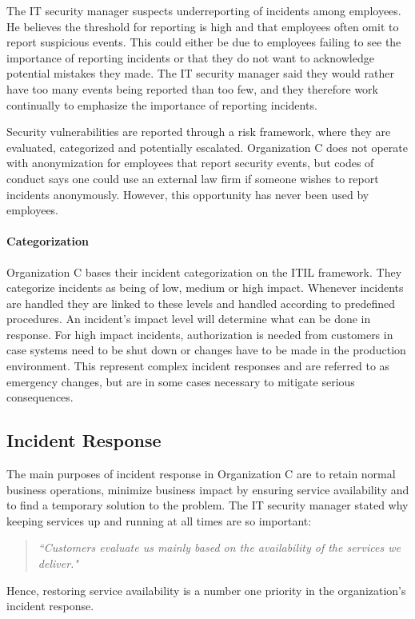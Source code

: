 The IT security manager suspects underreporting of incidents among employees. He believes the threshold for reporting is high and that employees often omit to report suspicious events. This could either be due to employees failing to see the importance of reporting incidents or that they do not want to acknowledge potential mistakes they made. The IT security manager said they would rather have too many events being reported than too few, and they therefore work continually to emphasize the importance of reporting incidents.

Security vulnerabilities are reported through a risk framework, where they are evaluated, categorized and potentially escalated. Organization C does not operate with anonymization for employees that report security events, but codes of conduct says one could use an external law firm if someone wishes to report incidents anonymously. However, this opportunity has never been used by employees. 

\paragraph{Categorization}
Organization C bases their incident categorization on the ITIL framework. They categorize incidents as being of low, medium or high impact. Whenever incidents are handled they are linked to these levels and handled according to predefined procedures. An incident's impact level will determine what can be done in response. For high impact incidents, authorization is needed from customers in case systems need to be shut down or changes have to be made in the production environment. This represent complex incident responses and are referred to as emergency changes, but are in some cases necessary to mitigate serious consequences. 

\subsection{Incident Response}
The main purposes of incident response in Organization C are to retain normal business operations, minimize business impact by ensuring service availability and to find a temporary solution to the problem. The IT security manager stated why keeping services up and running at all times are so important:

\begin{quote}
\textit{``Customers evaluate us mainly based on the availability of the services we deliver."}
\end{quote}
Hence, restoring service availability is a number one priority in the organization's incident response.

